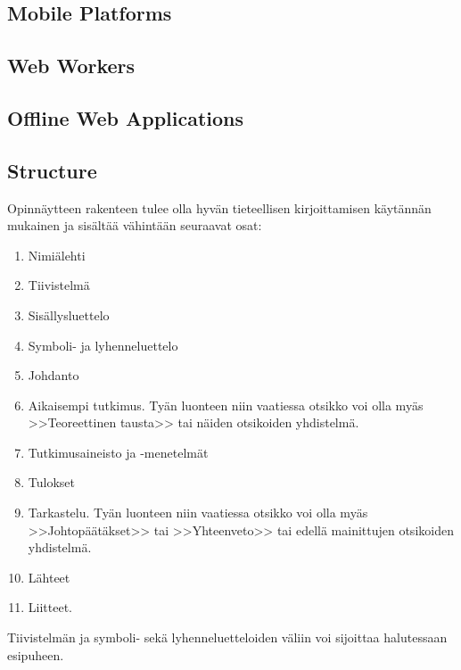 \documentclass[english,12pt,a4paper,pdftex]{article}
\begin{document}
\subsection{Mobile Platforms}

\subsection{Web Workers}

\subsection{Offline Web Applications}

\subsection*{Structure}

Opinnäytteen rakenteen tulee olla hyvän tieteellisen
kirjoittamisen käytännän mukainen ja sisältää vähintään seuraavat
osat:

\begin{enumerate}
\item Nimiälehti
\item Tiivistelmä
\item Sisällysluettelo
\item Symboli- ja lyhenneluettelo
\item \label{a} Johdanto
\item  Aikaisempi tutkimus. Tyän luonteen niin vaatiessa otsikko voi olla myäs
        >>Teoreettinen tausta>>  tai näiden otsikoiden yhdistelmä.
\item Tutkimusaineisto ja -menetelmät %
\item Tulokset
\item \label{o} Tarkastelu. Tyän luonteen niin vaatiessa otsikko voi
      olla myäs >>Johtopäätäkset>> tai >>Yhteenveto>>
      tai edellä mainittujen otsikoiden yhdistelmä.
\item Lähteet
\item Liitteet.
\end{enumerate}

Tiivistelmän ja symboli- sekä lyhenneluetteloiden
väliin voi sijoittaa halutessaan esipuheen.
\end{document}
